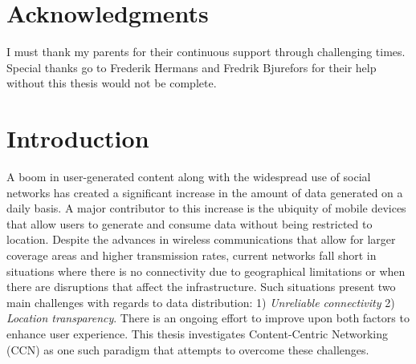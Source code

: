 \documentclass[a4paper,12pt]{report}      %
\begin{document}
\pagebreak
\chapter*{Acknowledgments}

I must thank my parents for their continuous support through challenging times. Special thanks go to Frederik Hermans and Fredrik Bjurefors for their help without this thesis would not be complete.

\bigskip\bigskip


\tableofcontents

\pagebreak
\chapter*{}

\pagebreak
\chapter{Introduction}
A boom in user-generated content along with the widespread use of social networks has created a significant increase in the amount of data generated on a daily basis. A major contributor to this increase is the ubiquity of mobile devices that allow users to generate and consume data without being restricted to location. Despite the advances in wireless communications that allow for larger coverage areas and higher transmission rates, current networks fall short in situations where there is no connectivity due to geographical limitations or when there are disruptions that affect the infrastructure. Such situations present two main challenges with regards to data distribution: 1) \emph{Unreliable connectivity} 2) \emph{Location transparency}. There is an ongoing effort to improve upon both factors to enhance user experience. This thesis investigates Content-Centric Networking (CCN) as one such paradigm that
attempts to overcome these challenges.

\end{document}

